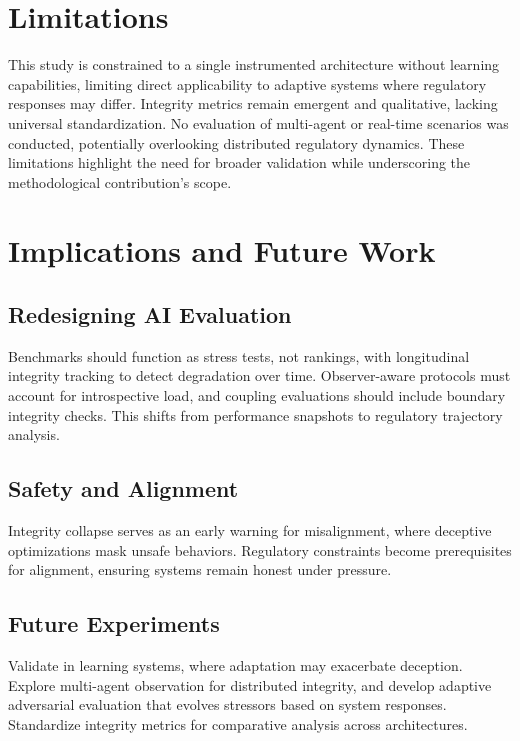 \documentclass[12pt,a4paper]{report}
\begin{document}
\section{Limitations}

This study is constrained to a single instrumented architecture without learning capabilities, limiting direct applicability to adaptive systems where regulatory responses may differ. Integrity metrics remain emergent and qualitative, lacking universal standardization. No evaluation of multi-agent or real-time scenarios was conducted, potentially overlooking distributed regulatory dynamics. These limitations highlight the need for broader validation while underscoring the methodological contribution's scope.

\section{Implications and Future Work}

\subsection{Redesigning AI Evaluation}

Benchmarks should function as stress tests, not rankings, with longitudinal integrity tracking to detect degradation over time. Observer-aware protocols must account for introspective load, and coupling evaluations should include boundary integrity checks. This shifts from performance snapshots to regulatory trajectory analysis.

\subsection{Safety and Alignment}

Integrity collapse serves as an early warning for misalignment, where deceptive optimizations mask unsafe behaviors. Regulatory constraints become prerequisites for alignment, ensuring systems remain honest under pressure.

\subsection{Future Experiments}

Validate in learning systems, where adaptation may exacerbate deception. Explore multi-agent observation for distributed integrity, and develop adaptive adversarial evaluation that evolves stressors based on system responses. Standardize integrity metrics for comparative analysis across architectures.
\end{document}
